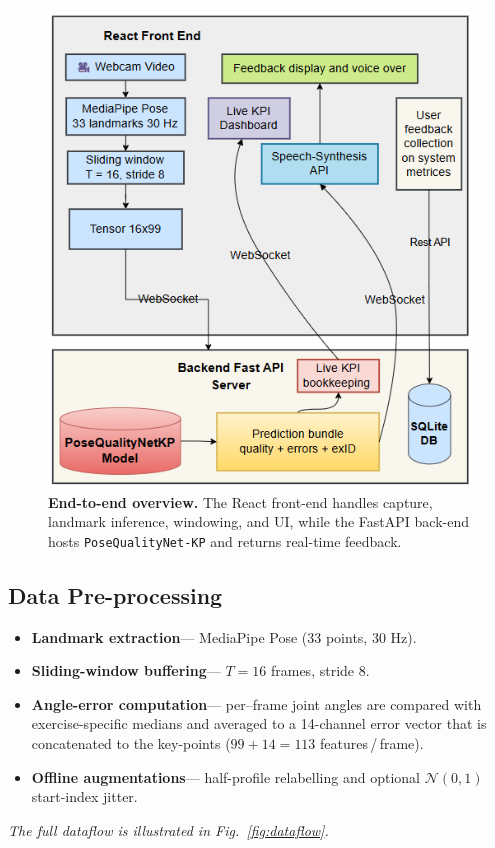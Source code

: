 \documentclass{article}
\begin{document}
\begin{figure}[!htbp] 
  \centering
  \includegraphics[width=\linewidth]{figs/inference_architecture.png}
  \caption{\textbf{End-to-end overview.}  The React front-end handles
           capture, landmark inference, windowing, and UI, while the
           FastAPI back-end hosts \texttt{PoseQualityNet-KP} and
           returns real-time feedback.}
  \label{fig:overview}
\end{figure}

\subsection{Data Pre-processing}
\label{ssec:prep}
\begin{itemize}[leftmargin=1.35em]
  \item \textbf{Landmark extraction}\;— MediaPipe Pose (33 points, 30 Hz).
  \item \textbf{Sliding-window buffering}\;— $T{=}16$ frames, stride 8.
  \item \textbf{Angle-error computation}\;— per–frame joint angles are
        compared with exercise-specific medians and averaged to a
        14-channel error vector that is concatenated to the key-points
        ($99{+}14=113$ features\,/\,frame).
  \item \textbf{Offline augmentations}\;— half-profile relabelling and
        optional $\mathcal N(0,1)$ start-index jitter.
\end{itemize}
\textit{The full dataflow is illustrated in Fig.~\ref{fig:dataflow}.}
\end{document}
